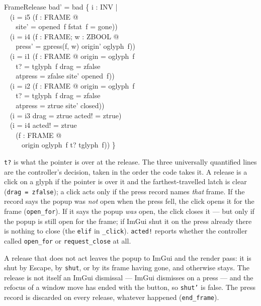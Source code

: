 \documentclass[a4paper,10pt,fleqn]{article}
\begin{document}
\begin{schema}{FrameRelease}
  bad' = bad \cup \{ i : INV | \\
  \quad~ (i = i5 \land (\exists f : FRAME @ \\
  \quad~ \quad~ site' = opened~f \land fstat~f = gone)) \\
  \quad~ \lor (i = i4 \land (\exists f : FRAME; w : ZBOOL @ \\
  \quad~ \quad~ press' = gpress(f, w) \land origin' \neq oglyph~f)) \\
  \quad~ \lor (i = i1 \land (\exists f : FRAME @ origin = oglyph~f \\
  \quad~ \quad~ \land t? = tglyph~f \land drag = zfalse \\
  \quad~ \quad~ \land atpress = zfalse \land site' \neq opened~f)) \\
  \quad~ \lor (i = i2 \land (\exists f : FRAME @ origin = oglyph~f \\
  \quad~ \quad~ \land t? = tglyph~f \land drag = zfalse \\
  \quad~ \quad~ \land atpress = ztrue \land site' \neq closed)) \\
  \quad~ \lor (i = i3 \land drag = ztrue \land acted! = ztrue) \\
  \quad~ \lor (i = i4 \land acted! = ztrue \\
  \quad~ \quad~ \land (\forall f : FRAME @ \\
  \quad~ \quad~ \quad~ origin \neq oglyph~f \lor t? \neq tglyph~f)) \}
\end{schema}

\texttt{t?} is what the pointer is over at the release.  The three universally
quantified lines are the controller's decision, taken in the order the code
takes it.  A release is a click on a glyph if the pointer is over it and the
farthest-travelled latch is clear (\texttt{drag~=~zfalse}); a click acts only
if the press record names \emph{that} frame.  If the record says the popup was
\emph{not} open when the press fell, the click opens it for the frame
(\texttt{open\_for}).  If it says the popup \emph{was} open, the click closes
it --- but only if the popup is still open for the frame; if ImGui shut it on
the press already there is nothing to close (the \texttt{elif} in
\texttt{\_click}).  \texttt{acted!} reports whether the controller called
\texttt{open\_for} or \texttt{request\_close} at all.

A release that does not act leaves the popup to ImGui and the render pass: it
is shut by Escape, by \texttt{shut}, or by its frame having gone, and otherwise
stays.  The release is not itself an ImGui dismissal --- ImGui dismisses on a
press --- and the refocus of a window move has ended with the button, so
\texttt{shut'} is false.  The press record is discarded on every release,
whatever happened (\texttt{end\_frame}).
\end{document}
